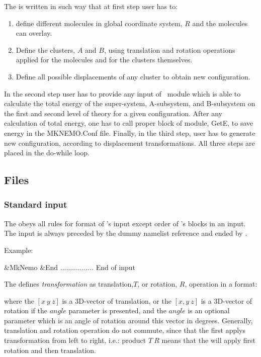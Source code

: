 The  is written in such way that at first step user has to:
\begin{enumerate}
\item define different molecules in global coordinate system, $R$ and the molecules can overlay.
\item Define the clusters, $A$ and $B$, using translation and rotation operations applied for the molecules and for the clusters themselves.
\item Define all possible displacements of any cluster to obtain new configuration.
\end{enumerate}
In the second step user has to provide any input of \molcas\  module which is able to calculate the total energy of the super-system, A-subsystem, and B-subsystem on the first and second level of theory for a given configuration. After any calculation of total energy, one has to call proper block of  module, GetE, to save energy in the MKNEMO.Conf file. Finally, in the third step, user has to generate new configuration, according to displacement transformations. All three steps are placed in the do-while loop.

\subsection{Files}
\label{UG:sec:mknemo_files}
\subsubsection{Standard input}
The  obeys all rules for format of \molcas's input except order of 's blocks in an input. The input is always preceded by the dummy namelist reference
 and ended by .

Example:
\begin{sourcelisting}
&MkNemo &End
  .................
End of input
\end{sourcelisting}

The  defines {\it transformation} as translation,$T$, or rotation, $R$, operation in a format:
\begin{sourcelisting}
[ x y z angle]
\end{sourcelisting}
where the $[x\ y\ z]$  is a 3D-vector of translation, or the $[x,y\ z]$ is a 3D-vector of rotation if the $angle$ parameter is presented, and the $angle$ is an optional parameter which is an angle of rotation around this vector in degrees. Generally, translation and rotation operation do not commute, since that the  first applys transformation from left to right, i.e.: product $T\ R$ means that the  will apply first rotation and then translation.



